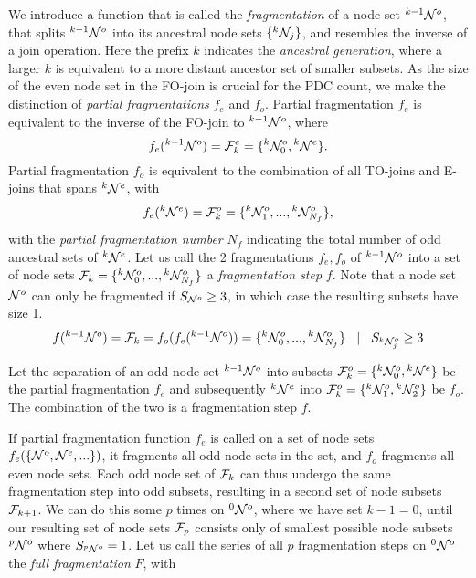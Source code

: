 We introduce a function that is called the \emph{fragmentation} of a node set ${}^{k-1}\mathcal{N}^o$, that splits ${}^{k-1}\mathcal{N}^o$ into its ancestral node sets $\{{}^{k}\mathcal{N}_j\}$, and resembles the inverse of a join operation. Here the prefix $k$ indicates the \emph{ancestral generation}, where a larger $k$ is equivalent to a more distant ancestor set of smaller subsets. As the size of the even node set in the FO-join is crucial for the PDC count, we make the distinction of \emph{partial fragmentations} $f_e$ and $f_o$. Partial fragmentation $f_e$ is equivalent to the inverse of the FO-join to ${}^{k-1}\mathcal{N}^o$, where
\begin{equation}\label{eq:pfe}
  f_e({}^{k-1}\mathcal{N}^o) = \mathcal{F}^e_k = \{{}^{k}\mathcal{N}^o_0, {}^{k}\mathcal{N}^e\}.
\end{equation}
Partial fragmentation $f_o$ is equivalent to the combination of all TO-joins and E-joins that spans ${}^{k}\mathcal{N}^e$, with
\begin{equation}\label{eq:pfo}
  f_e({}^{k}\mathcal{N}^e) = \mathcal{F}^o_k=\{{}^{k}\mathcal{N}^{o}_1,...,{}^{k}\mathcal{N}^o_{N_f}\},
\end{equation}
with the \emph{partial fragmentation number} $N_f$ indicating the total number of odd ancestral sets of ${}^{k}\mathcal{N}^e$. Let us call the 2 fragmentations $f_e, f_o$ of ${}^{k-1}\mathcal{N}^o$ into a set of node sets $\mathcal{F}_k = \{{}^{k}\mathcal{N}^o_0,..., {}^{k}\mathcal{N}^{o}_{N_f}\}$ a \emph{fragmentation step} $f$. Note that a node set $\mathcal{N}^o$ can only be fragmented if $S_{\mathcal{N}^o} \geq 3$, in which case the resulting subsets have size 1.
\begin{equation}\label{eq:fstep}
  f({}^{k-1}\mathcal{N}^o) = \mathcal{F}_k = f_o(f_e({}^{k-1}\mathcal{N}^o)) = \{{}^{k}\mathcal{N}^o_0,...,{}^{k}\mathcal{N}^{o}_{N_f}\} \hspace{.3cm} | \hspace{.3cm} S_{{}^{k}\mathcal{N}^o_j} \geq 3
\end{equation}


\begin{lemma}\label{lem:partialfrag}
  Let the separation of an odd node set ${}^{k-1}\mathcal{N}^o$ into subsets $\mathcal{F}_k^o=\{{}^{k}\mathcal{N}^o_0, {}^{k}\mathcal{N}^e\}$ be the partial fragmentation $f_e$ and subsequently ${}^{k}\mathcal{N}^e$ into  $\mathcal{F}_k^o=\{{}^{k}\mathcal{N}^o_1, {}^{k}\mathcal{N}^o_2\}$ be $f_o$. The combination of the two is a fragmentation step $f$.
\end{lemma}



If partial fragmentation function $f_e$ is called on a set of node sets $f_e(\{\mathcal{N}^o, \mathcal{N}^e, ...\})$, it fragments all odd node sets in the set, and $f_o$ fragments all even node sets. Each odd node set of $\mathcal{F}_k$ can thus undergo the same fragmentation step into odd subsets, resulting in a second set of node subsets $\mathcal{F}_{k+1}$. We can do this some $p$ times on ${}^{0}\mathcal{N}^o$, where we have set $k-1=0$, until our resulting set of node sets $\mathcal{F}_{p}$ consists only of smallest possible node subsets ${}^{p}\mathcal{N}^o$ where $S_{{}^{p}\mathcal{N}^o}=1$. Let us call the series of all $p$ fragmentation steps on ${}^{0}\mathcal{N}^o$ the \emph{full fragmentation} $F$, with

